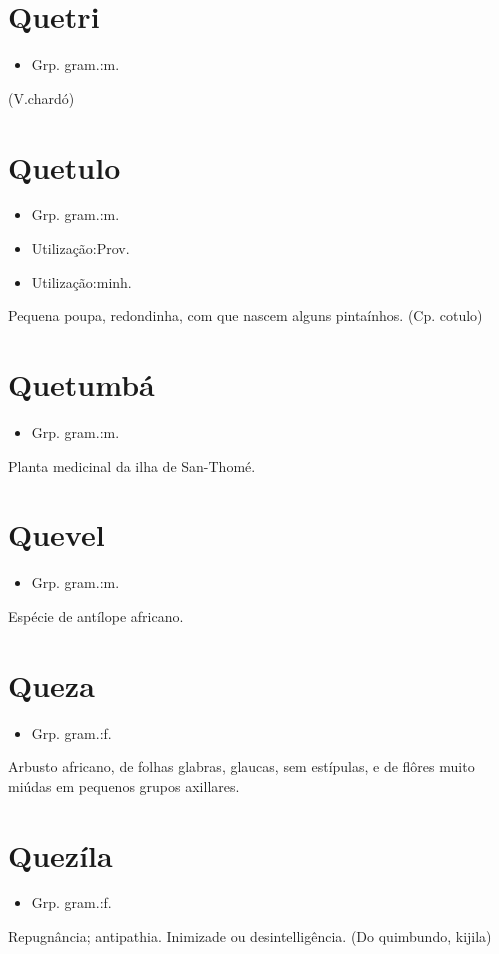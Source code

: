 \section{Quetri}
\begin{itemize}
\item {Grp. gram.:m.}
\end{itemize}
(V.chardó)
\section{Quetulo}
\begin{itemize}
\item {Grp. gram.:m.}
\end{itemize}
\begin{itemize}
\item {Utilização:Prov.}
\end{itemize}
\begin{itemize}
\item {Utilização:minh.}
\end{itemize}
Pequena poupa, redondinha, com que nascem alguns pintaínhos.
(Cp. \textunderscore cotulo\textunderscore )
\section{Quetumbá}
\begin{itemize}
\item {Grp. gram.:m.}
\end{itemize}
Planta medicinal da ilha de San-Thomé.
\section{Quevel}
\begin{itemize}
\item {Grp. gram.:m.}
\end{itemize}
Espécie de antílope africano.
\section{Queza}
\begin{itemize}
\item {Grp. gram.:f.}
\end{itemize}
Arbusto africano, de folhas glabras, glaucas, sem estípulas, e de flôres muito miúdas em pequenos grupos axillares.
\section{Quezíla}
\begin{itemize}
\item {Grp. gram.:f.}
\end{itemize}
Repugnância; antipathia.
Inimizade ou desintelligência.
(Do quimbundo, \textunderscore kijila\textunderscore )
